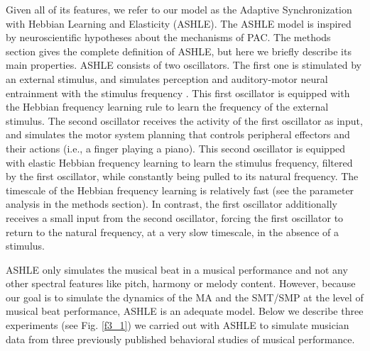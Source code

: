 \documentclass{report}
\begin{document}
Given all of its features, we refer to our model as the Adaptive Synchronization with Hebbian Learning and Elasticity (ASHLE). The ASHLE model is inspired by neuroscientific hypotheses about the mechanisms of PAC. The methods section gives the complete definition of ASHLE, but here we briefly describe its main properties. ASHLE consists of two oscillators. The first one is stimulated by an external stimulus, and simulates perception and auditory-motor neural entrainment with the stimulus frequency \cite{large2015neural, patel2014evolutionary, daly2014changes, grahn2009feeling, grahn2013finding}. This first oscillator is equipped with the Hebbian frequency learning rule to learn the frequency of the external stimulus. The second oscillator receives the activity of the first oscillator as input, and simulates the motor system planning that controls peripheral effectors and their actions (i.e., a finger playing a piano). This second oscillator is equipped with elastic Hebbian frequency learning to learn the stimulus frequency, filtered by the first oscillator, while constantly being pulled to its natural frequency. The timescale of the Hebbian frequency learning is relatively fast (see the parameter analysis in the methods section). In contrast, the first oscillator additionally receives a small input from the second oscillator, forcing the first oscillator to return to the natural frequency, at a very slow timescale, in the absence of a stimulus. 

ASHLE only simulates the musical beat in a musical performance and not any other spectral features like pitch, harmony or melody content. However, because our goal is to simulate the dynamics of the MA and the SMT/SMP at the level of musical beat performance, ASHLE is an adequate model. Below we describe three experiments (see Fig.{} \ref{f3_1}) we carried out with ASHLE to simulate musician data from three previously published behavioral studies of musical performance.
\end{document}
